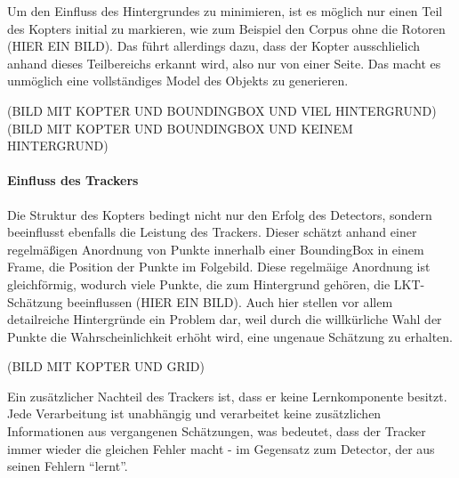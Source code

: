 Um den Einfluss des Hintergrundes zu minimieren, ist es möglich nur einen Teil des Kopters initial zu markieren, wie zum Beispiel den Corpus ohne die Rotoren (HIER EIN BILD). Das führt allerdings dazu, dass der Kopter ausschlielich anhand dieses Teilbereichs erkannt wird, also nur von einer Seite. Das macht es unmöglich eine vollständiges Model des Objekts zu generieren.

(BILD MIT KOPTER UND BOUNDINGBOX UND VIEL HINTERGRUND)
(BILD MIT KOPTER UND BOUNDINGBOX UND KEINEM HINTERGRUND)

\paragraph{Einfluss des Trackers}
Die Struktur des Kopters bedingt nicht nur den Erfolg des Detectors, sondern beeinflusst ebenfalls die Leistung des Trackers. Dieser schätzt anhand einer regelmäßigen Anordnung von Punkte innerhalb einer BoundingBox in einem Frame, die Position der Punkte im Folgebild. Diese regelmäige Anordnung ist gleichförmig, wodurch viele Punkte, die zum Hintergrund gehören, die LKT-Schätzung beeinflussen (HIER EIN BILD). Auch hier stellen vor allem detailreiche Hintergründe ein Problem dar, weil durch die willkürliche Wahl der Punkte die Wahrscheinlichkeit erhöht wird, eine ungenaue Schätzung zu erhalten.

(BILD MIT KOPTER UND GRID)

Ein zusätzlicher Nachteil des Trackers ist, dass er keine Lernkomponente besitzt. Jede Verarbeitung ist unabhängig und verarbeitet keine zusätzlichen Informationen aus vergangenen Schätzungen, was bedeutet, dass der Tracker immer wieder die gleichen Fehler macht - im Gegensatz zum Detector, der aus seinen Fehlern ``lernt''.

